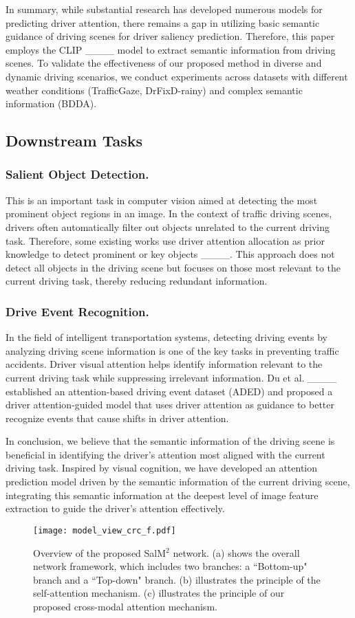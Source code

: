 In summary, while substantial research has developed numerous models for predicting driver attention, there remains a gap in utilizing basic semantic guidance of driving scenes for driver saliency prediction. Therefore, this paper employs the CLIP ____ model to extract semantic information from driving scenes. To validate the effectiveness of our proposed method in diverse and dynamic driving scenarios, we conduct experiments across datasets with different weather conditions (TrafficGaze, DrFixD-rainy) and complex semantic information (BDDA).

\subsection{Downstream Tasks}
\subsubsection{Salient Object Detection.} This is an important task in computer vision aimed at detecting the most prominent object regions in an image. In the context of traffic driving scenes, drivers often automatically filter out objects unrelated to the current driving task. Therefore, some existing works use driver attention allocation as prior knowledge to detect prominent or key objects ____. This approach does not detect all objects in the driving scene but focuses on those most relevant to the current driving task, thereby reducing redundant information.
\subsubsection{Drive Event Recognition.} In the field of intelligent transportation systems, detecting driving events by analyzing driving scene information is one of the key tasks in preventing traffic accidents. Driver visual attention helps identify information relevant to the current driving task while suppressing irrelevant information. Du et al. ____ established an attention-based driving event dataset (ADED) and proposed a driver attention-guided model that uses driver attention as guidance to better recognize events that cause shifts in driver attention.

In conclusion, we believe that the semantic information of the driving scene is beneficial in identifying the driver’s attention most aligned with the current driving task. Inspired by visual cognition, we have developed an attention prediction model driven by the semantic information of the current driving scene, integrating this semantic information at the deepest level of image feature extraction to guide the driver's attention effectively.
\begin{figure*}
    \centering
    \texttt{[image: model\_view\_crc\_f.pdf]}
    \caption{Overview of the proposed SalM$^2$ network. (a) shows the overall network framework, which includes two branches: a ``Bottom-up" branch and a ``Top-down" branch. (b) illustrates the principle of the self-attention mechanism. (c) illustrates the principle of our proposed cross-modal attention mechanism.}
    \label{fig:model_overview}
\end{figure*}